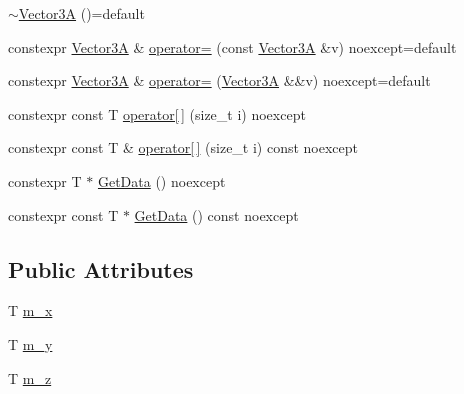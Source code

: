 \begin{DoxyCompactItemize}
\item 
\hyperlink{structmage_1_1_vector3_a_3_01_t_00_01typename_01std_1_1enable__if__t_3_01std_1_1is__arithmetic__7070ab83646a86866d1e3c9d7eeea37a_a55cb7ee7cc304362dee2716e65c63771}{$\sim$\+Vector3A} ()=default
\item 
constexpr \hyperlink{structmage_1_1_vector3_a}{Vector3A} \& \hyperlink{structmage_1_1_vector3_a_3_01_t_00_01typename_01std_1_1enable__if__t_3_01std_1_1is__arithmetic__7070ab83646a86866d1e3c9d7eeea37a_ae3ff2b65536938b9a5ddef3b75dfdbf9}{operator=} (const \hyperlink{structmage_1_1_vector3_a}{Vector3A} \&v) noexcept=default
\item 
constexpr \hyperlink{structmage_1_1_vector3_a}{Vector3A} \& \hyperlink{structmage_1_1_vector3_a_3_01_t_00_01typename_01std_1_1enable__if__t_3_01std_1_1is__arithmetic__7070ab83646a86866d1e3c9d7eeea37a_ae8fd7a6989126c8f4b23a44edd931487}{operator=} (\hyperlink{structmage_1_1_vector3_a}{Vector3A} \&\&v) noexcept=default
\item 
constexpr const T \hyperlink{structmage_1_1_vector3_a_3_01_t_00_01typename_01std_1_1enable__if__t_3_01std_1_1is__arithmetic__7070ab83646a86866d1e3c9d7eeea37a_a0058c55b46db4d8907f0e761bdf00966}{operator\mbox{[}$\,$\mbox{]}} (size\+\_\+t i) noexcept
\item 
constexpr const T \& \hyperlink{structmage_1_1_vector3_a_3_01_t_00_01typename_01std_1_1enable__if__t_3_01std_1_1is__arithmetic__7070ab83646a86866d1e3c9d7eeea37a_a06e09b18c8dce7873abe5b2b9c9a3337}{operator\mbox{[}$\,$\mbox{]}} (size\+\_\+t i) const noexcept
\item 
constexpr T $\ast$ \hyperlink{structmage_1_1_vector3_a_3_01_t_00_01typename_01std_1_1enable__if__t_3_01std_1_1is__arithmetic__7070ab83646a86866d1e3c9d7eeea37a_af069d9c1d82794b361c505aaf017b8bb}{Get\+Data} () noexcept
\item 
constexpr const T $\ast$ \hyperlink{structmage_1_1_vector3_a_3_01_t_00_01typename_01std_1_1enable__if__t_3_01std_1_1is__arithmetic__7070ab83646a86866d1e3c9d7eeea37a_ae95406c3ad724f066eddb85cd67117a3}{Get\+Data} () const noexcept
\end{DoxyCompactItemize}
\subsection*{Public Attributes}
\begin{DoxyCompactItemize}
\item 
T \hyperlink{structmage_1_1_vector3_a_3_01_t_00_01typename_01std_1_1enable__if__t_3_01std_1_1is__arithmetic__7070ab83646a86866d1e3c9d7eeea37a_a2d814b28ee9cf0bffcb63d7c1a5ee6dd}{m\+\_\+x}
\item 
T \hyperlink{structmage_1_1_vector3_a_3_01_t_00_01typename_01std_1_1enable__if__t_3_01std_1_1is__arithmetic__7070ab83646a86866d1e3c9d7eeea37a_a6bba6c15e9be995048f666bf12d78a06}{m\+\_\+y}
\item 
T \hyperlink{structmage_1_1_vector3_a_3_01_t_00_01typename_01std_1_1enable__if__t_3_01std_1_1is__arithmetic__7070ab83646a86866d1e3c9d7eeea37a_abfacda98bbb66cb12247be860f20cead}{m\+\_\+z}
\end{DoxyCompactItemize}


